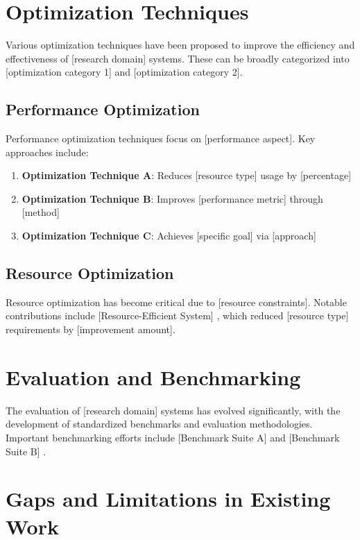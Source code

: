 \lipsum[4]

\section{Optimization Techniques}

Various optimization techniques have been proposed to improve the efficiency and effectiveness of [research domain] systems. These can be broadly categorized into [optimization category 1] and [optimization category 2].

\subsection{Performance Optimization}

Performance optimization techniques focus on [performance aspect]. Key approaches include:
\begin{enumerate}
    \item \textbf{Optimization Technique A}: Reduces [resource type] usage by [percentage]
    \item \textbf{Optimization Technique B}: Improves [performance metric] through [method]
    \item \textbf{Optimization Technique C}: Achieves [specific goal] via [approach]
\end{enumerate}

\subsection{Resource Optimization}

Resource optimization has become critical due to [resource constraints]. Notable contributions include [Resource-Efficient System] \cite{example-reference-25}, which reduced [resource type] requirements by [improvement amount].

\section{Evaluation and Benchmarking}

The evaluation of [research domain] systems has evolved significantly, with the development of standardized benchmarks and evaluation methodologies. Important benchmarking efforts include [Benchmark Suite A] \cite{example-reference-26} and [Benchmark Suite B] \cite{example-reference-27}.

\lipsum[5]

\section{Gaps and Limitations in Existing Work}

